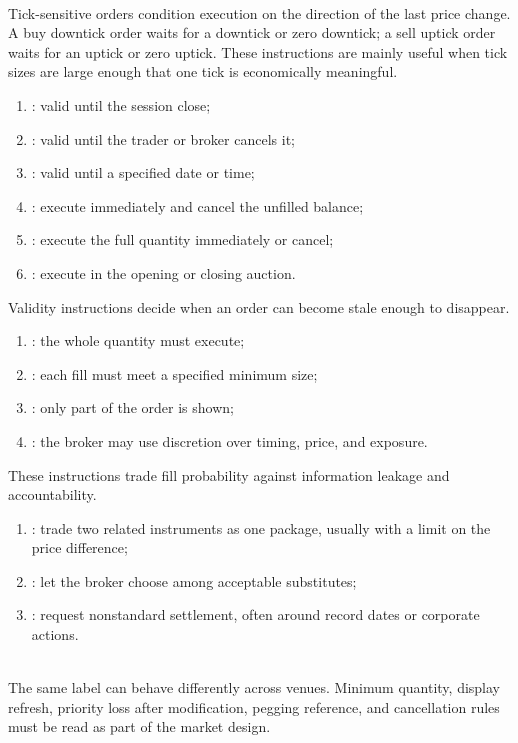 \begin{marketrule} \\
Tick-sensitive orders condition execution on the direction of the last price change. A buy downtick order waits for a downtick or zero downtick; a sell uptick order waits for an uptick or zero uptick. These instructions are mainly useful when tick sizes are large enough that one tick is economically meaningful.
\end{marketrule}

\begin{taxonomy} 
\begin{enumerate}[label=\roman*.]
\setlength{\itemsep}{0pt}
\item {}: valid until the session close;
\item {}: valid until the trader or broker cancels it;
\item {}: valid until a specified date or time;
\item {}: execute immediately and cancel the unfilled balance;
\item {}: execute the full quantity immediately or cancel;
\item {}: execute in the opening or closing auction.
\end{enumerate}
Validity instructions decide when an order can become stale enough to disappear.
\end{taxonomy}

\begin{taxonomy} 
\begin{enumerate}[label=\roman*.]
\setlength{\itemsep}{0pt}
\item {}: the whole quantity must execute;
\item {}: each fill must meet a specified minimum size;
\item {}: only part of the order is shown;
\item {}: the broker may use discretion over timing, price, and exposure.
\end{enumerate}
These instructions trade fill probability against information leakage and accountability.
\end{taxonomy}

\begin{taxonomy} 
\begin{enumerate}[label=\roman*.]
\setlength{\itemsep}{0pt}
\item {}: trade two related instruments as one package, usually with a limit on the price difference;
\item {}: let the broker choose among acceptable substitutes;
\item {}: request nonstandard settlement, often around record dates or corporate actions.
\end{enumerate}
\end{taxonomy}

\begin{caveat} \\
The same label can behave differently across venues. Minimum quantity, display refresh, priority loss after modification, pegging reference, and cancellation rules must be read as part of the market design.
\end{caveat}
